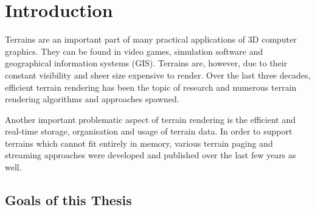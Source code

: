 \chapter{Introduction}
Terrains are an important part of many practical applications of 3D computer graphics.
They can be found in video games, simulation software and geographical information systems (GIS). 
Terrains are, however, due to their constant visibility and sheer size expensive to render.
Over the last three decades, efficient terrain rendering has been the topic of research
and numerous terrain rendering algorithms and approaches spawned. 

Another important problematic aspect of terrain rendering is the efficient 
and real-time storage, organisation and usage of terrain data. 
In order to support terrains which cannot fit entirely in 
memory, various terrain paging and streaming approaches 
were developed and published over the last few years as well.


\section{Goals of this Thesis}






